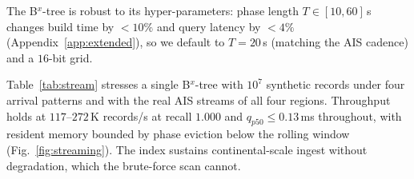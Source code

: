 The B$^{x}$-tree is robust to its hyper-parameters: phase length
$T\!\in\![10,60]$\,s changes build time by $<\!10\%$ and query latency by
$<\!4\%$ (Appendix~\ref{app:extended}), so we default to $T\!=\!20$\,s
(matching the AIS cadence) and a $16$-bit grid.


Table~\ref{tab:stream} stresses a single B$^{x}$-tree with $10^{7}$
synthetic records under four arrival patterns and with the real AIS
streams of all four regions. Throughput holds at $117$--$272$\,K
records/s at recall $1.000$ and $q_{p50}\!\le\!0.13$\,ms throughout, with
resident memory bounded by phase eviction below the rolling window
(Fig.~\ref{fig:streaming}). The index sustains continental-scale ingest
without degradation, which the brute-force scan cannot.
